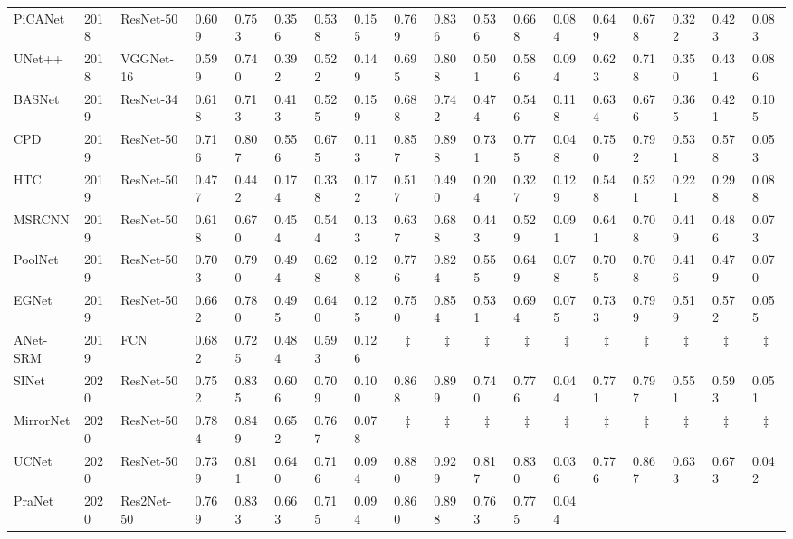 \documentclass[lettersize,journal]{IEEEtran}
\begin{document}
\begin{table*}[th]
{\begin{tabular}{l|l|l|lllll|lllll|lllll}
			PiCANet\cite{picanet}&2018&ResNet-50&0.609&0.753&0.356&0.538&0.155&
			0.769&0.836&0.536&0.668&0.084&
			0.649&0.678&0.322&0.423&0.083\\
			UNet++\cite{unetplus}&2018&VGGNet-16&0.599&0.740&0.392&0.522&0.149&
			0.695&0.808&0.501&0.586&0.094&
			0.623&0.718&0.350&0.431&0.086\\ \midrule
			BASNet\cite{basnet}&2019&ResNet-34&0.618&0.713&0.413&0.525&0.159&
			0.688&0.742&0.474&0.546&0.118&
			0.634&0.676&0.365&0.421&0.105\\
			CPD\cite{cpd}&2019&ResNet-50&0.716&0.807&0.556&0.675&0.113&
			0.857&0.898&0.731&0.775&0.048&
			0.750&0.792&0.531&0.578&0.053\\
			HTC\cite{htc}&2019&ResNet-50&0.477&0.442&0.174&0.338&0.172&
			0.517&0.490&0.204&0.327&0.129&
			0.548&0.521&0.221&0.298&0.088\\
			MSRCNN\cite{masksrcnn}&2019&ResNet-50&0.618&0.670&0.454&0.544&0.133&
			0.637&0.688&0.443&0.529&0.091&
			0.641&0.708&0.419&0.486&0.073\\
			PoolNet\cite{poolnet}&2019&ResNet-50&0.703&0.790&0.494&0.628&0.128&
			0.776&0.824&0.555&0.649&0.078&
			0.705&0.708&0.416&0.479&0.070\\
			EGNet\cite{egnet}&2019&ResNet-50&0.662&0.780&0.495&0.640&0.125&
			0.750&0.854&0.531&0.694&0.075&
			0.733&0.799&0.519&0.572&0.055 \\ 
			ANet-SRM\cite{anet}&2019&FCN&0.682&0.725&0.484&0.593&0.126&
			\multicolumn{1}{c}{‡} & \multicolumn{1}{c}{‡} & \multicolumn{1}{c}{‡} & \multicolumn{1}{c}{‡} &\multicolumn{1}{c|}{‡}&
			\multicolumn{1}{c}{‡} & \multicolumn{1}{c}{‡} & \multicolumn{1}{c}{‡} & \multicolumn{1}{c}{‡} &\multicolumn{1}{c}{‡} \\ \midrule
			SINet\cite{sinet}&2020&ResNet-50&0.752&0.835&0.606&0.709&0.100&
			0.868&0.899&0.740&0.776&0.044&
			0.771&0.797&0.551&0.593&0.051\\
			MirrorNet\cite{mirrornet}&2020&ResNet-50&0.784&0.849&0.652&0.767&0.078&
			\multicolumn{1}{c}{‡} & \multicolumn{1}{c}{‡} & \multicolumn{1}{c}{‡} & \multicolumn{1}{c}{‡} &\multicolumn{1}{c|}{‡}&
			\multicolumn{1}{c}{‡} & \multicolumn{1}{c}{‡} & \multicolumn{1}{c}{‡} & \multicolumn{1}{c}{‡} &\multicolumn{1}{c}{‡} \\ 
			UCNet\cite{ucnet}&2020&ResNet-50&0.739&0.811&0.640&0.716&0.094&
			0.880&0.929&0.817&0.830&0.036&
			0.776&0.867&0.633&0.673&0.042 \\
			PraNet\cite{pranet}&2020&Res2Net-50&0.769&0.833&0.663&0.715&0.094&
			0.860&0.898&0.763&0.775&0.044&

\end{tabular}}
\end{table*}
\end{document}
